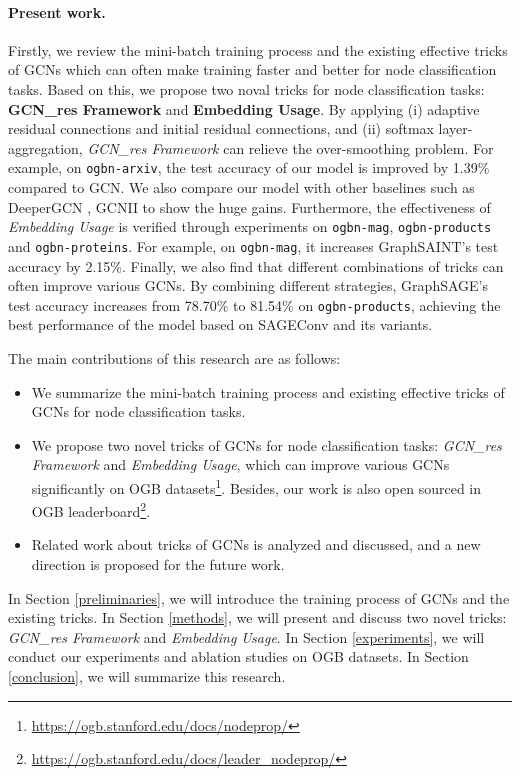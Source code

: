 \documentclass[runningheads]{llncs}
\begin{document}
\paragraph{\textbf{Present work.}} Firstly, we review the mini-batch training process and the existing effective tricks of GCNs which can often make training faster and
better for node classification tasks. Based on this, we propose two noval tricks for node
classification tasks: \textbf{GCN\_res Framework} and \textbf{Embedding Usage}. By
applying (i) adaptive residual connections and initial residual connections, and (ii)
softmax layer-aggregation, \textsl{GCN\_res Framework} can relieve
the over-smoothing problem. For example, on \texttt{ogbn-arxiv}, the test accuracy of our model is 
improved by 1.39\% compared to GCN. We also
compare our model with other
baselines such as DeeperGCN \cite{li2020deepergcn}, GCNII \cite{chen2020simple} to show the huge gains.
Furthermore, the effectiveness of \textsl{Embedding Usage} is
verified through experiments on \texttt{ogbn-mag}, \texttt{ogbn-products} and \texttt{ogbn-proteins}. For example, on \texttt{ogbn-mag}, it increases GraphSAINT's test accuracy by 2.15\%. Finally, we
also find that different combinations of tricks can
often improve various GCNs. By combining different strategies, GraphSAGE's test accuracy 
increases from 78.70\% to 81.54\% on \texttt{ogbn-products}, achieving the best performance of the
model based on SAGEConv and its variants.

The main contributions of this research are as follows:
\begin{itemize}
\item[1)]
  We summarize the mini-batch training process and existing effective tricks of GCNs for node classification tasks.
\item[2)]
  We propose two novel tricks of GCNs for node classification tasks:  \textsl{GCN\_res Framework} and \textsl{Embedding Usage}, which can improve various GCNs significantly on OGB datasets\footnote{\url{https://ogb.stanford.edu/docs/nodeprop/}}. Besides, our work is also open sourced in OGB leaderboard\footnote{\url{https://ogb.stanford.edu/docs/leader_nodeprop/}}. 
\item[3)]
  Related work about tricks of GCNs is analyzed and discussed, and a new
  direction is proposed for the future work.
\end{itemize}

In Section \ref{preliminaries}, we will introduce the training process of GCNs and the
existing tricks. In Section \ref{methods}, we will present and discuss two novel tricks: \textsl{GCN\_res
Framework} and \textsl{Embedding Usage}. In Section \ref{experiments}, we will conduct our experiments and ablation studies on OGB datasets. In Section \ref{conclusion}, we will summarize this research.
\end{document}
